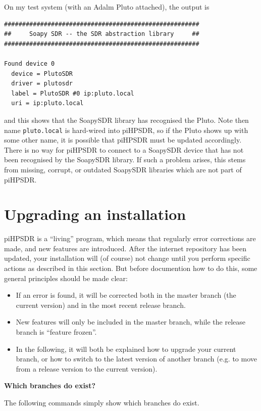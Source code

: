 \documentclass[12pt]{book}
\def\pH{pi\-HPSDR\xspace}
\begin{document}
On my test system (with an Adalm Pluto attached), the output is

\begin{small}
\begin{verbatim}
######################################################
##     Soapy SDR -- the SDR abstraction library     ##
######################################################

Found device 0
  device = PlutoSDR
  driver = plutosdr
  label = PlutoSDR #0 ip:pluto.local
  uri = ip:pluto.local
\end{verbatim}
\end{small}

and this shows that the SoapySDR library has recognised the Pluto. Note then name \texttt{pluto.local}
is hard-wired into \pH, so if the Pluto shows up with some other name, it is possible that
\pH must be updated accordingly. There is no way for \pH to connect
to a SoapySDR device that has not been recognised by the SoapySDR library. If such a problem arises, this
stems from missing, corrupt, or outdated SoapySDR libraries which are not part of \pH.

\section{Upgrading an installation}
\pH is a ``living'' program, which means that regularly  error corrections are made, and new features are
introduced. After the internet repository has been updated, your installation will (of course) not change
until you perform specific actions as described in this section. But before documention how to do this,
some general principles should be made clear:

\begin{itemize}
\item{If an error is found, it will be corrected both in the master branch (the current version) and in the
most recent release branch.}
\item{New features will only be included in the master branch, while the release branch is ``feature frozen''.}
\item{In the following, it will both be explained how to upgrade your current branch, or how to
switch to the latest version of  another branch (e.g. to move from a release version to the current version).}
\end{itemize}

\textbf{Which branches do exist?}

The following commands simply show which branches do exist.
\end{document}
